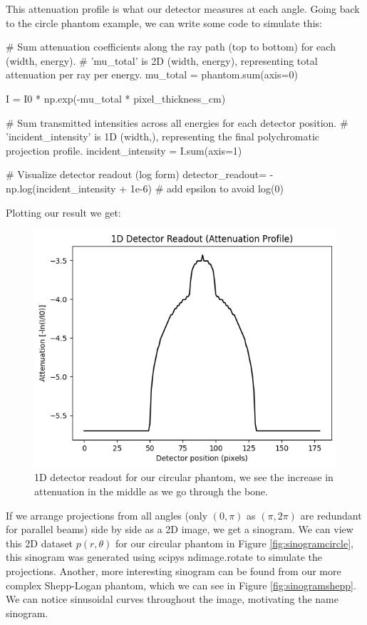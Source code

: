 \documentclass{article}
\theoremstyle{definition}
\begin{document}
This attenuation profile is what our detector measures at each angle. Going back to the circle phantom example, we can write some code to simulate this:

\begin{python}
# Sum attenuation coefficients along the ray path (top to bottom) for each (width, energy).
# 'mu_total' is 2D (width, energy), representing total attenuation per ray per energy.
mu_total = phantom.sum(axis=0)

I = I0 * np.exp(-mu_total * pixel_thickness_cm)

# Sum transmitted intensities across all energies for each detector position.
# 'incident_intensity' is 1D (width,), representing the final polychromatic projection profile.
incident_intensity = I.sum(axis=1)

# Visualize detector readout (log form)
detector_readout= -np.log(incident_intensity + 1e-6)  # add epsilon to avoid log(0)
\end{python}

Plotting our result we get:
\begin{figure}[H]
	\includegraphics[scale=0.6]{detectorreadout.png}
	\caption{1D detector readout for our circular phantom, we see the increase in attenuation in the middle as we go through the bone.}
	\label{fig:detector1d}
\end{figure}

If we arrange projections from all angles (only $(0,\pi)$ as $(\pi, 2\pi)$ are redundant for parallel beams) side by side as a 2D image, we get a sinogram. We can view this 2D dataset $p(r, \theta)$ for our circular phantom in Figure \ref{fig:sinogramcircle}, this sinogram was generated using scipys ndimage.rotate to simulate the projections. 
Another, more interesting sinogram can be found from our more complex Shepp-Logan phantom, which we can see in Figure \ref{fig:sinogramshepp}. We can notice sinusoidal curves throughout the image, motivating the name sinogram.
\end{document}
